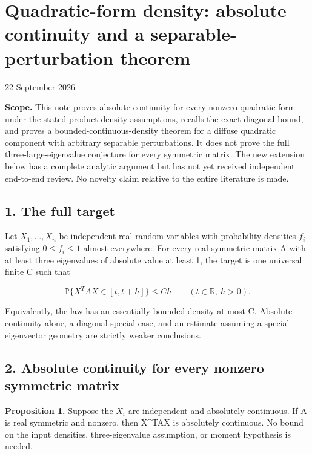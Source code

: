 \documentclass[
  11pt,
]{article}
\author{}
\date{}
\begin{document}
\section{Quadratic-form density: absolute continuity and a
separable-perturbation
theorem}\label{quadratic-form-density-absolute-continuity-and-a-separable-perturbation-theorem}

22 September 2026

\textbf{Scope.} This note proves absolute continuity for every nonzero
quadratic form under the stated product-density assumptions, recalls the
exact diagonal bound, and proves a bounded-continuous-density theorem
for a diffuse quadratic component with arbitrary separable
perturbations. It does not prove the full three-large-eigenvalue
conjecture for every symmetric matrix. The new extension below has a
complete analytic argument but has not yet received independent
end-to-end review. No novelty claim relative to the entire literature is
made.

\subsection{1. The full target}\label{the-full-target}

Let \(X_1,\ldots,X_n\) be independent real random variables with
probability densities \(f_i\) satisfying \(0\le f_i\le1\) almost
everywhere. For every real symmetric matrix A with at least three
eigenvalues of absolute value at least 1, the target is one universal
finite C such that

\[
\mathbb P\{X^TAX\in[t,t+h]\}\le Ch\qquad(t\in\mathbb R,\ h>0).
\]

Equivalently, the law has an essentially bounded density at most C.
Absolute continuity alone, a diagonal special case, and an estimate
assuming a special eigenvector geometry are strictly weaker conclusions.

\subsection{2. Absolute continuity for every nonzero symmetric
matrix}\label{absolute-continuity-for-every-nonzero-symmetric-matrix}

\textbf{Proposition 1.} Suppose the \(X_i\) are independent and
absolutely continuous. If A is real symmetric and nonzero, then X\^{}TAX
is absolutely continuous. No bound on the input densities,
three-eigenvalue assumption, or moment hypothesis is needed.
\end{document}
